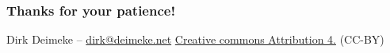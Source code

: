 \documentclass[t,handout]{beamer}
\begin{document}

\begin{frame}\frametitle{Thanks for your patience!}
    \vfill
    Dirk Deimeke -- \href{mailto:dirk@deimeke.net}{dirk@deimeke.net}
    \vfill
    \href{https://creativecommons.org/licenses/by/4.0/}{Creative commons Attribution 4.} (CC-BY)
\end{frame}
\end{document}
